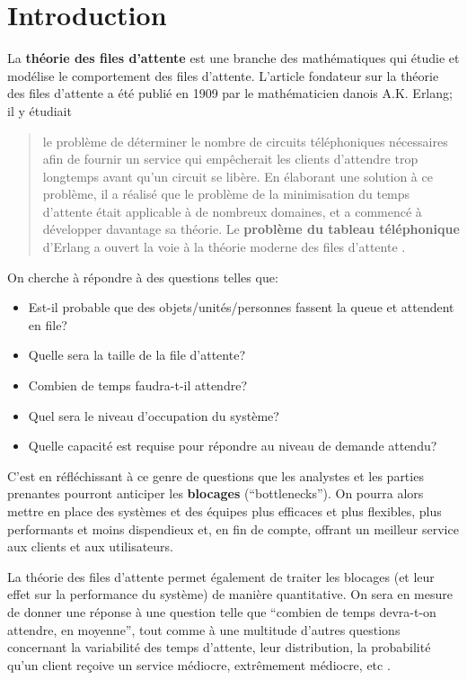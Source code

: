 \section{Introduction} La \textbf{théorie des files d'attente} est une branche des mathématiques qui étudie et modélise le comportement des files d'attente. L'article fondateur sur la théorie des files d'attente \cite{QS_Erlang} a été publié en 1909 par le mathématicien danois A.K. Erlang; il y étudiait \begin{quote} le problème de déterminer le nombre de circuits téléphoniques nécessaires afin de fournir un service qui empêcherait les clients d'attendre trop longtemps avant qu'un circuit se libère. En élaborant une solution à ce problème, il a  réalisé que le problème de la minimisation du temps d'attente était applicable à de nombreux domaines, et a commencé à développer davantage sa théorie. Le \textbf{problème du tableau téléphonique} d'Erlang a ouvert la voie à la théorie moderne des files d'attente \cite{QS_Berry}.\end{quote}
On cherche \`a répondre à des questions telles que:
\begin{itemize}[noitemsep]
\item Est-il probable que des objets/unités/personnes fassent la queue et attendent en file?
\item Quelle sera la taille de la file d'attente?
\item Combien de temps faudra-t-il attendre?
\item Quel sera le niveau d'occupation du système?
\item Quelle capacité est requise pour répondre au niveau de demande attendu?
\end{itemize}
C'est en réfléchissant à ce genre de questions que les analystes et les parties prenantes pourront anticiper les \textbf{blo\-ca\-ges} (``bottlenecks''). On pourra alors mettre en place des systèmes et des équipes plus efficaces et plus flexibles, plus performants et moins dispendieux et, en fin de compte, offrant un meilleur service aux clients et aux utilisateurs. \par La théorie des files d'attente permet également de traiter les blocages (et leur effet sur la performance du syst\`eme) de mani\`ere quantitative. On sera en mesure de donner une r\'eponse \`a une question telle que ``combien de temps devra-t-on attendre, en moyenne'', tout comme \`a une multitude d'autres questions concernant la variabilité des temps d'attente, leur distribution, la probabilité qu'un client reçoive un service m\'ediocre, extrêmement médiocre, etc \cite{QS_K1}.
